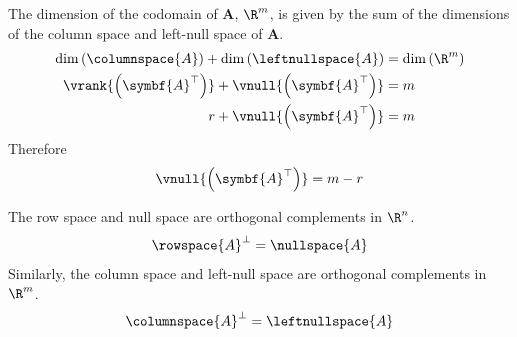 \documentclass{article}
\begin{document}
\begin{corollary}
    The dimension of the codomain of \(\symbf{A}\), \(\R^m\), is given by
    the sum of the dimensions of the column space and left-null space of \(\symbf{A}\).
    \begin{align*}
        \dim{\left( \columnspace{A} \right)} + \dim{\left( \leftnullspace{A} \right)} & = \dim{\left( \R^m \right)} \\
        \vrank{\left( \symbf{A}^\top \right)} + \vnull{\left( \symbf{A}^\top \right)} & = m                         \\
        r + \vnull{\left( \symbf{A}^\top \right)}                                     & = m
    \end{align*}
    Therefore
    \begin{equation*}
        \vnull{\left( \symbf{A}^\top \right)} = m - r
    \end{equation*}
\end{corollary}
\begin{theorem}
    The row space and null space are orthogonal complements in \(\R^n\).
    \begin{equation*}
        \rowspace{A}^\perp = \nullspace{A}
    \end{equation*}
    Similarly, the column space and left-null space are orthogonal complements in \(\R^m\).
    \begin{equation*}
        \columnspace{A}^\perp = \leftnullspace{A}
    \end{equation*}
\end{theorem}
\end{document}
